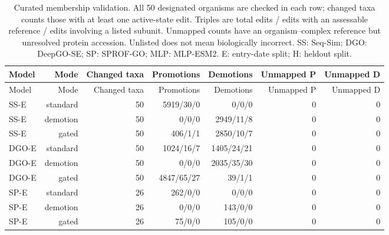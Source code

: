 \begingroup\scriptsize
\setlength{\tabcolsep}{4pt}
\begin{longtable}{lrrrrrr}
\caption{Curated membership validation. All 50 designated organisms are checked in each row; changed taxa counts those with at least one active-state edit. Triples are total edits / edits with an assessable reference / edits involving a listed subunit. Unmapped counts have an organism--complex reference but unresolved protein accession. Unlisted does not mean biologically incorrect. SS: Seq-Sim; DGO: DeepGO-SE; SP: SPROF-GO; MLP: MLP-ESM2. E: entry-date split; H: heldout split.}\label{tab:supp-membership}\\
\toprule
Model & Mode & Changed taxa & Promotions & Demotions & Unmapped P & Unmapped D \\
\midrule
\endfirsthead
\toprule
Model & Mode & Changed taxa & Promotions & Demotions & Unmapped P & Unmapped D \\
\midrule
\endhead
SS-E & standard & 50 & 5919/30/0 & 0/0/0 & 0 & 0 \\
SS-E & demotion & 50 & 0/0/0 & 2949/11/8 & 0 & 0 \\
SS-E & gated & 50 & 406/1/1 & 2850/10/7 & 0 & 0 \\
DGO-E & standard & 50 & 1024/16/7 & 1405/24/21 & 0 & 0 \\
DGO-E & demotion & 50 & 0/0/0 & 2035/35/30 & 0 & 0 \\
DGO-E & gated & 50 & 4847/65/27 & 39/1/1 & 0 & 0 \\
SP-E & standard & 26 & 262/0/0 & 0/0/0 & 0 & 0 \\
SP-E & demotion & 26 & 0/0/0 & 143/0/0 & 0 & 0 \\
SP-E & gated & 26 & 75/0/0 & 105/0/0 & 0 & 0 \\
\bottomrule
\end{longtable}
\endgroup
